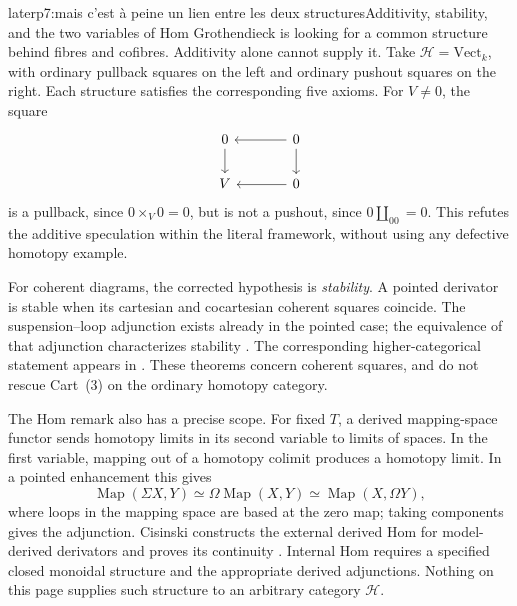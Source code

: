 \begin{dcomment}{later}{p7:mais c'est à peine un lien entre les deux structures}{Additivity, stability, and the two variables of Hom}
Grothendieck is looking for a common structure behind fibres and cofibres. Additivity alone cannot supply it. Take $\mathcal H=\mathrm{Vect}_k$, with ordinary pullback squares on the left and ordinary pushout squares on the right. Each structure satisfies the corresponding five axioms. For $V\ne0$, the square
\[
 \begin{tikzcd}[column sep=large]
 0\ar[d]&0\ar[l]\ar[d]\\
 V&0\ar[l]
 \end{tikzcd}
\]
is a pullback, since $0\times_V0=0$, but is not a pushout, since $0\amalg_00=0$. This refutes the additive speculation within the literal framework, without using any defective homotopy example.

For coherent diagrams, the corrected hypothesis is \emph{stability}. A pointed derivator is stable when its cartesian and cocartesian coherent squares coincide. The suspension--loop adjunction exists already in the pointed case; the equivalence of that adjunction characterizes stability \citetext{\citealp[Proposition~3.17]{Groth2013}; \citealp[Theorem~7.1, arXiv v2]{GrothPontoShulman2014}}. The corresponding higher-categorical statement appears in \citet[Proposition~1.1.3.4]{Lurie2017HA}. These theorems concern coherent squares, and do not rescue Cart~(3) on the ordinary homotopy category.

The Hom remark also has a precise scope. For fixed $T$, a derived mapping-space functor sends homotopy limits in its second variable to limits of spaces. In the first variable, mapping out of a homotopy colimit produces a homotopy limit. In a pointed enhancement this gives
\[
 \operatorname{Map}(\Sigma X,Y)
 \simeq\Omega\operatorname{Map}(X,Y)
 \simeq\operatorname{Map}(X,\Omega Y),
\]
where loops in the mapping space are based at the zero map; taking components gives the adjunction. Cisinski constructs the external derived Hom for model-derived derivators and proves its continuity \citep[Proposition~6.13, pp.~239--240]{Cisinski2003}. Internal Hom requires a specified closed monoidal structure and the appropriate derived adjunctions. Nothing on this page supplies such structure to an arbitrary category $\mathcal H$.
\end{dcomment}

